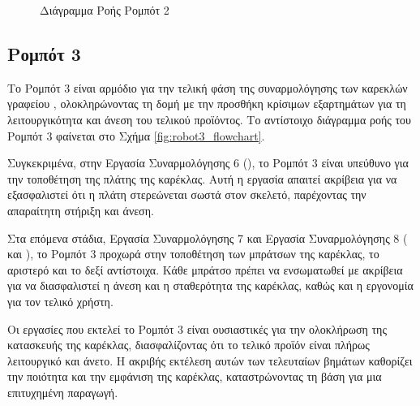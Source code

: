 \begin{figure}[H]
  \centering
  \caption{Διάγραμμα Ροής Ρομπότ 2}
  \label{fig:robot2_flowchart}
\end{figure}

\subsection{Ρομπότ 3}
\noindent Το Ρομπότ 3 είναι αρμόδιο για την τελική φάση της συναρμολόγησης των καρεκλών γραφείου , ολοκληρώνοντας τη δομή με την προσθήκη κρίσιμων εξαρτημάτων για τη λειτουργικότητα και άνεση του τελικού προϊόντος. Το αντίστοιχο διάγραμμα ροής του Ρομπότ 3 φαίνεται στο Σχήμα \ref{fig:robot3_flowchart}.

Συγκεκριμένα, στην Εργασία Συναρμολόγησης 6 (), το Ρομπότ 3 είναι υπεύθυνο για την τοποθέτηση της πλάτης της καρέκλας. Αυτή η εργασία απαιτεί ακρίβεια για να εξασφαλιστεί ότι η πλάτη στερεώνεται σωστά στον σκελετό, παρέχοντας την απαραίτητη στήριξη και άνεση.

Στα επόμενα στάδια, Εργασία Συναρμολόγησης 7 και Εργασία Συναρμολόγησης 8 ( και ), το Ρομπότ 3 προχωρά στην τοποθέτηση των μπράτσων της καρέκλας, το αριστερό και το δεξί αντίστοιχα. Κάθε μπράτσο πρέπει να ενσωματωθεί με ακρίβεια για να διασφαλιστεί η άνεση και η σταθερότητα της καρέκλας, καθώς και η εργονομία για τον τελικό χρήστη.

Οι εργασίες που εκτελεί το Ρομπότ 3 είναι ουσιαστικές για την ολοκλήρωση της κατασκευής της καρέκλας, διασφαλίζοντας ότι το τελικό προϊόν είναι πλήρως λειτουργικό και άνετο. Η ακριβής εκτέλεση αυτών των τελευταίων βημάτων καθορίζει την ποιότητα και την εμφάνιση της καρέκλας, καταστρώνοντας τη βάση για μια επιτυχημένη παραγωγή.

